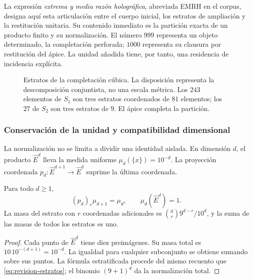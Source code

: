 La expresión \emph{extrema y media razón holográfica}, abreviada EMRH en
el corpus, designa aquí esta articulación entre el cuerpo inicial, los
estratos de ampliación y la restitución unitaria. Su contenido inmediato
es la partición exacta de un producto finito y su normalización. El número
\(999\) representa un objeto determinado, la completación perforada;
\(1000\) representa su clausura por restitución del ápice. La unidad
añadida tiene, por tanto, una residencia de incidencia explícita.

\begin{figure}[htbp]
\centering
{}
\caption{Estratos de la completación cúbica. La disposición representa
la descomposición conjuntista, no una escala métrica. Los \(243\) elementos
de \(S_1\) son tres estratos coordenados de \(81\) elementos; los \(27\)
de \(S_2\) son tres estratos de \(9\). El ápice completa la partición.}
\label{fig:revision-emrh}
\end{figure}



\subsubsection{Conservación de la unidad y compatibilidad dimensional}

La normalización no se limita a dividir una identidad aislada. En dimensión
\(d\), el producto \(\widehat E^d\) lleva la medida uniforme
\(\mu_d(\{x\})=10^{-d}\). La proyección coordenada
\(p_d:\widehat E^{d+1}\to\widehat E^d\) suprime la última coordenada.

\begin{proposition}
Para todo \(d\geq1\),
\[
 (p_d)_*\mu_{d+1}=\mu_d,
 \qquad \mu_d(\widehat E^d)=1.
\]
La masa del estrato con \(r\) coordenadas adicionales es
\(\binom dr9^{d-r}/10^d\), y la suma de las masas de todos los estratos
es uno.
\end{proposition}
\begin{proof}
Cada punto de \(\widehat E^d\) tiene diez preimágenes. Su masa total es
\(10\,10^{-(d+1)}=10^{-d}\). La igualdad para cualquier subconjunto
se obtiene sumando sobre sus puntos. La fórmula estratificada procede
del mismo recuento que \eqref{eq:revision-estratos}; el binomio
\((9+1)^d\) da la normalización total.
\end{proof}

